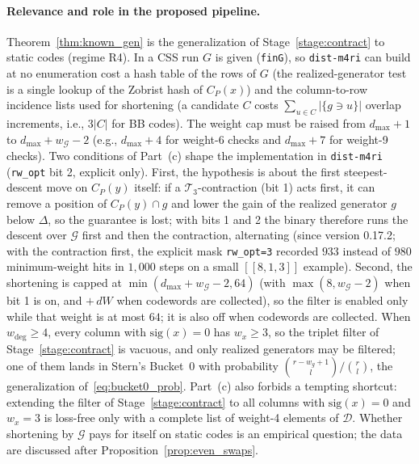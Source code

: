 \documentclass[12pt]{article}
\theoremstyle{definition}
\newcommand{\Dc}{\mathcal{D}}
\newcommand{\Tc}{\mathcal{T}_3}
\newcommand{\Gc}{\mathcal{G}}
\newcommand{\ttt}[1]{\texttt{#1}}
\begin{document}
\paragraph{Relevance and role in the proposed pipeline.}
Theorem~\ref{thm:known_gen} is the generalization of Stage~\ref{stage:contract} to static codes (regime R4). In a
CSS run $G$ is given (\ttt{finG}), so \ttt{dist-m4ri} can build at no enumeration cost a hash table of the rows of $G$
(the realized-generator test is a single lookup of the Zobrist hash of $C_P(x)$) and the column-to-row incidence
lists used for shortening (a candidate $C$ costs $\sum_{u \in C} |\{g \ni u\}|$ overlap increments, i.e., $3|C|$ for
BB codes). The weight cap must be raised from $d_{\max} + 1$ to $d_{\max} + w_{\Gc} - 2$ (e.g., $d_{\max} + 4$ for
weight-6 checks and $d_{\max} + 7$ for weight-9 checks). Two conditions of Part~(c) shape the implementation in
\ttt{dist-m4ri} (\ttt{rw\_opt} bit 2, explicit only). First, the hypothesis is about the first steepest-descent move
on $C_P(y)$ itself: if a $\Tc$-contraction (bit 1) acts first, it can remove a position of $C_P(y) \cap g$ and lower
the gain of the realized generator $g$ below $\Delta$, so the guarantee is lost; with bits 1 and 2 the binary
therefore runs the descent over $\Gc$ first and then the contraction, alternating (since version 0.17.2; with the
contraction first, the explicit mask \ttt{rw\_opt=3} recorded $933$ instead of $980$ minimum-weight hits in $1{,}000$
steps on a small $[[8, 1, 3]]$ example). Second, the shortening is capped at $\min(d_{\max} + w_{\Gc} - 2, 64)$
(with $\max(8, w_{\Gc} - 2)$ when bit 1 is on, and $+\,dW$ when codewords are collected), so the filter is enabled
only while that weight is at most $64$; it is also off when codewords are collected. When $w_{\deg} \ge 4$, every
column with $\mathrm{sig}(x) = 0$ has $w_x \ge 3$, so the triplet filter of Stage~\ref{stage:contract} is vacuous, and
only realized generators may be
filtered; one of them lands in Stern's Bucket~0 with probability $\binom{r - w_g + 1}{l} / \binom{r}{l}$, the
generalization of~\eqref{eq:bucket0_prob}. Part~(c) also forbids a tempting shortcut: extending the filter of
Stage~\ref{stage:contract} to all columns with $\mathrm{sig}(x) = 0$ and $w_x = 3$ is loss-free only with a complete
list of weight-4 elements of $\Dc$. Whether shortening by $\Gc$ pays for itself on static codes is an empirical
question; the data are discussed after Proposition~\ref{prop:even_swaps}.
\end{document}
